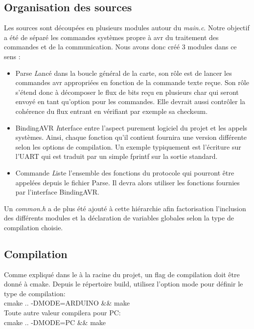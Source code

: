 \subsection{Organisation des sources}
Les sources sont découpées en plusieurs modules autour du \textit{main.c}. Notre
objectif a été de séparé les commandes systèmes propre à avr du traitement des commandes
et de la communication. Nous avons donc créé 3 modules dans ce sens :
\begin{itemize}
\item Parse 
  { 
    \textit 
    Lancé dans la boucle général de la carte, son rôle est de lancer
    les commandes avr appropriées en fonction de la commande texte reçue. Son rôle s'étend 
    donc à décomposer le flux de bits reçu en plusieurs char qui seront envoyé en tant 
    qu'option pour les commandes. Elle devrait aussi contrôler la cohérence du flux entrant
    en vérifiant par exemple sa checksum.
  }
\item BindingAVR
  {
    \textit
    Interface entre l'aspect purement logiciel du projet et les appels systèmes. Ainsi,
    chaque fonction qu'il contient fournira une version différente selon les options de 
    compilation. Un exemple typiquement est l'écriture sur l'UART qui est traduit par un 
    simple fprintf sur la sortie standard.
  }
\item Commande
  {
    \textit
    Liste l'ensemble des fonctions du protocole qui pourront être appelées depuis le fichier 
    Parse. Il devra alors utiliser les fonctions fournies par l'interface BindingAVR.
  }
\end{itemize}

Un \textit{common.h} a de plus été ajouté à cette hiérarchie afin factorisation l'inclusion des
différents modules et la déclaration de variables globales selon la type de compilation
choisie.\\


\subsection{Compilation}
Comme expliqué dans le  à la racine du projet, un flag de compilation doit
être donné à cmake. Depuis le répertoire build, utilisez l'option mode pour définir le type
de compilation:\\
cmake .. -DMODE=ARDUINO && make\\

Toute autre valeur compilera pour PC:\\
cmake .. -DMODE=PC && make\\
